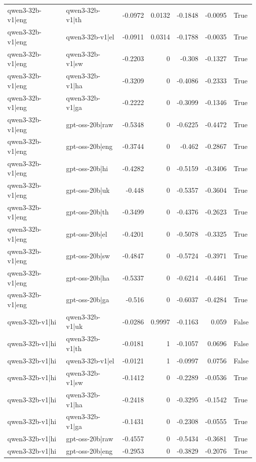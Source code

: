 \begin{table}
\begin{tabular}{l l r r r r l}
qwen3-32b-v1|eng & qwen3-32b-v1|th & -0.0972 & 0.0132 & -0.1848 & -0.0095 & True \\
qwen3-32b-v1|eng & qwen3-32b-v1|el & -0.0911 & 0.0314 & -0.1788 & -0.0035 & True \\
qwen3-32b-v1|eng & qwen3-32b-v1|sw & -0.2203 & 0 & -0.308 & -0.1327 & True \\
qwen3-32b-v1|eng & qwen3-32b-v1|ha & -0.3209 & 0 & -0.4086 & -0.2333 & True \\
qwen3-32b-v1|eng & qwen3-32b-v1|ga & -0.2222 & 0 & -0.3099 & -0.1346 & True \\
qwen3-32b-v1|eng & gpt-oss-20b|raw & -0.5348 & 0 & -0.6225 & -0.4472 & True \\
qwen3-32b-v1|eng & gpt-oss-20b|eng & -0.3744 & 0 & -0.462 & -0.2867 & True \\
qwen3-32b-v1|eng & gpt-oss-20b|hi & -0.4282 & 0 & -0.5159 & -0.3406 & True \\
qwen3-32b-v1|eng & gpt-oss-20b|uk & -0.448 & 0 & -0.5357 & -0.3604 & True \\
qwen3-32b-v1|eng & gpt-oss-20b|th & -0.3499 & 0 & -0.4376 & -0.2623 & True \\
qwen3-32b-v1|eng & gpt-oss-20b|el & -0.4201 & 0 & -0.5078 & -0.3325 & True \\
qwen3-32b-v1|eng & gpt-oss-20b|sw & -0.4847 & 0 & -0.5724 & -0.3971 & True \\
qwen3-32b-v1|eng & gpt-oss-20b|ha & -0.5337 & 0 & -0.6214 & -0.4461 & True \\
qwen3-32b-v1|eng & gpt-oss-20b|ga & -0.516 & 0 & -0.6037 & -0.4284 & True \\
qwen3-32b-v1|hi & qwen3-32b-v1|uk & -0.0286 & 0.9997 & -0.1163 & 0.059 & False \\
qwen3-32b-v1|hi & qwen3-32b-v1|th & -0.0181 & 1 & -0.1057 & 0.0696 & False \\
qwen3-32b-v1|hi & qwen3-32b-v1|el & -0.0121 & 1 & -0.0997 & 0.0756 & False \\
qwen3-32b-v1|hi & qwen3-32b-v1|sw & -0.1412 & 0 & -0.2289 & -0.0536 & True \\
qwen3-32b-v1|hi & qwen3-32b-v1|ha & -0.2418 & 0 & -0.3295 & -0.1542 & True \\
qwen3-32b-v1|hi & qwen3-32b-v1|ga & -0.1431 & 0 & -0.2308 & -0.0555 & True \\
qwen3-32b-v1|hi & gpt-oss-20b|raw & -0.4557 & 0 & -0.5434 & -0.3681 & True \\
qwen3-32b-v1|hi & gpt-oss-20b|eng & -0.2953 & 0 & -0.3829 & -0.2076 & True \\

\end{tabular}
\end{table}
